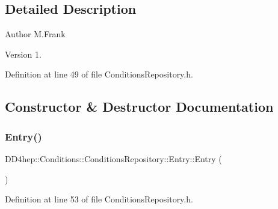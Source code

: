 \subsection{Detailed Description}
\begin{DoxyAuthor}{Author}
M.\+Frank 
\end{DoxyAuthor}
\begin{DoxyVersion}{Version}
1. 
\end{DoxyVersion}


Definition at line 49 of file Conditions\+Repository.\+h.



\subsection{Constructor \& Destructor Documentation}
\hypertarget{class_d_d4hep_1_1_conditions_1_1_conditions_repository_1_1_entry_a4b5b7b66f05263698a5f95afacf50c2d}{}\label{class_d_d4hep_1_1_conditions_1_1_conditions_repository_1_1_entry_a4b5b7b66f05263698a5f95afacf50c2d} 
\subsubsection{\texorpdfstring{Entry()}{Entry()}\hspace{0.1cm}{\footnotesize\ttfamily [1/2]}}
{\footnotesize\ttfamily D\+D4hep\+::\+Conditions\+::\+Conditions\+Repository\+::\+Entry\+::\+Entry (\begin{DoxyParamCaption}{ }\end{DoxyParamCaption})\hspace{0.3cm}{\ttfamily [inline]}}



Definition at line 53 of file Conditions\+Repository.\+h.

\hypertarget{class_d_d4hep_1_1_conditions_1_1_conditions_repository_1_1_entry_ae83cae74d588480e3e142c54fb198dc5}{}\label{class_d_d4hep_1_1_conditions_1_1_conditions_repository_1_1_entry_ae83cae74d588480e3e142c54fb198dc5} 
